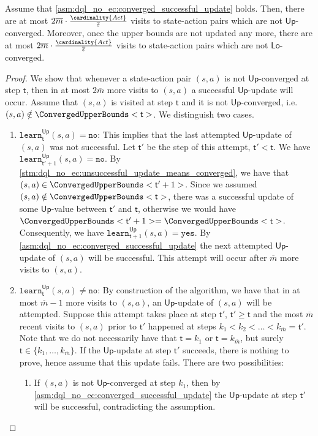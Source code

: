 \documentclass{theoretics}
\newcommand{\Actions}{Act}
\newcommand{\upperbound}{\mathsf{Up}}
\newcommand{\lowerbound}{\mathsf{Lo}}
\newcommand{\updatestep}{{\overline{\varepsilon}}}
\newcommand{\delay}{{\overline{m}}}
\newcommand{\learn}{\texttt{learn}}
\newcommand{\learnyes}{\texttt{yes}}
\newcommand{\learnno}{\texttt{no}}
\newcommand{\algostep}{\mathsf{t}}
\begin{document}
\begin{lemma} \label{stm:dql_no_ec:non_converged_visit_count}
	Assume that \cref{asm:dql_no_ec:converged_successful_update} holds.
	Then, there are at most $2 \delay \cdot \frac{\cardinality{\Actions}}{\updatestep}$ visits to state-action pairs which are not $\upperbound$-converged.
	Moreover, once the upper bounds are not updated any more, there are at most $2 \delay \cdot \frac{\cardinality{\Actions}}{\updatestep}$ visits to state-action pairs which are not $\lowerbound$-converged.
\end{lemma}

\begin{proof}
	We show that whenever a state-action pair $(s, a)$ is not $\upperbound$-converged at step $\algostep$, then in at most $2 \delay$ more visits to $(s, a)$ a successful $\upperbound$-update will occur.
	Assume that $(s, a)$ is visited at step $\algostep$ and it is not $\upperbound$-converged, i.e.\ $(s, a) \notin \ConvergedUpperBounds<\algostep>$.
	We distinguish two cases.
	\begin{enumerate}
		\item $\learn^\upperbound_\algostep(s, a) = \learnno$:
		This implies that the last attempted $\upperbound$-update of $(s, a)$ was not successful.
		Let $\algostep'$ be the step of this attempt, $\algostep' < \algostep$.
		We have $\learn^\upperbound_{\algostep' + 1}(s, a) = \learnno$.
		By \cref{stm:dql_no_ec:unsuccessful_update_means_converged}, we have that $(s, a) \in \ConvergedUpperBounds<\algostep'+1>$.
		Since we assumed $(s, a) \notin \ConvergedUpperBounds<\algostep>$, there was a successful update of some $\upperbound$-value between $\algostep'$ and $\algostep$, otherwise we would have $\ConvergedUpperBounds<\algostep'+1> = \ConvergedUpperBounds<\algostep>$.
		Consequently, we have $\learn^\upperbound_{\algostep+1}(s, a) = \learnyes$.
		By \cref{asm:dql_no_ec:converged_successful_update} the next attempted $\upperbound$-update of $(s, a)$ will be successful.
		This attempt will occur after $\delay$ more visits to $(s, a)$.

		\item $\learn^\upperbound_\algostep(s, a) \neq \learnno$:
		By construction of the algorithm, we have that in at most $\delay - 1$ more visits to $(s, a)$, an $\upperbound$-update of $(s, a)$ will be attempted.
		Suppose this attempt takes place at step $\algostep'$, $\algostep' \geq \algostep$ and the most $\delay$ recent visits to $(s, a)$ prior to $\algostep'$ happened at steps $k_1 < k_2 < \ldots < k_\delay = \algostep'$.
		Note that we do not necessarily have that $\algostep = k_1$ or $\algostep = k_\delay$, but surely $\algostep \in \{k_1, \dots, k_\delay\}$.
		If the $\upperbound$-update at step $\algostep'$ succeeds, there is nothing to prove, hence assume that this update fails.
		There are two possibilities:
		\begin{enumerate}
			\item
			If $(s, a)$ is not $\upperbound$-converged at step $k_1$, then by \cref{asm:dql_no_ec:converged_successful_update} the $\upperbound$-update at step $\algostep'$ will be successful, contradicting the assumption.


\end{enumerate}
\end{enumerate}
\end{proof}
\end{document}

